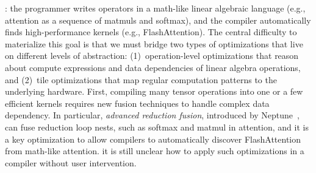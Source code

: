 :
the program\-mer writes operators in a math-like linear algebraic language
(e.g., attention as a sequence of matmuls and softmax),
and the compiler automatically finds high-performance kernels (e.g., FlashAttention).
The central difficulty to materialize this goal is that we must bridge two types of optimizations
that live on different levels of abstraction:
(1)~operation-level optimizations that reason about compute expressions and data
dependencies of linear algebra operations,
and (2)~tile optimizations that map regular computation patterns to the underlying hardware.
First, compiling many tensor operations into one or a few efficient kernels
requires new fusion techniques to handle complex data dependency.
In particular, \emph{advanced reduction fusion}, introduced by Neptune~\cite{neptune},
can fuse reduction loop nests, such as softmax and matmul in attention,
and it is a key optimization to allow compilers to automatically discover
FlashAttention from math-like attention.
it is still unclear how to apply such optimizations in a compiler without user intervention.

